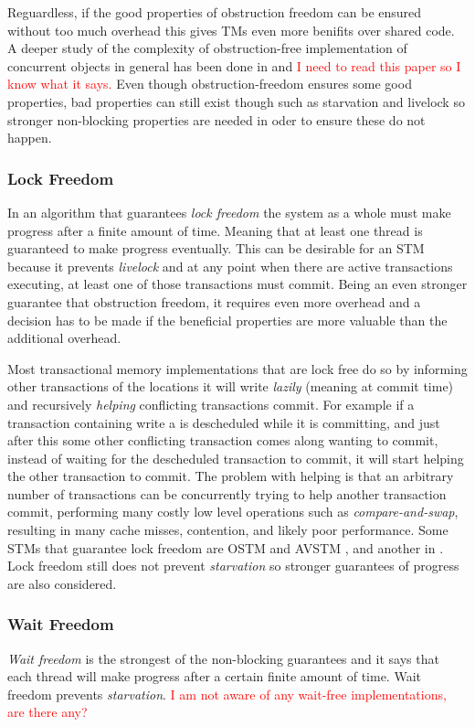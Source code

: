 Reguardless, if the good properties of obstruction freedom can be ensured without too much overhead this gives TMs even more benifits over shared code.
A deeper study of the complexity of obstruction-free implementation of concurrent objects in general has been done in \cite{1538908} and \textcolor{Red}{I need to read this paper so I know what it says.}
Even though obstruction-freedom ensures some good properties, bad properties can still exist though such as starvation and livelock so stronger non-blocking properties are needed in oder to ensure these do not happen.

\subsubsection{Lock Freedom}
In an algorithm that guarantees \emph{lock freedom} the system as a whole must make progress after a finite amount of time.
Meaning that at least one thread is guaranteed to make progress eventually.
This can be desirable for an STM because it prevents \emph{livelock} and at any point when there are active transactions executing, at least one of those transactions must commit.
Being an even stronger guarantee that obstruction freedom, it requires even more overhead and a decision has to be made if the beneficial properties are more valuable than the additional overhead.

Most transactional memory implementations that are lock free do so by informing other transactions of the locations it will write \emph{lazily} (meaning at commit time) and recursively \emph{helping} conflicting transactions commit.
For example if a transaction containing write a is descheduled while it is committing, and just after this some other conflicting transaction comes along wanting to commit, instead of waiting for the descheduled transaction to commit, it will start helping the other transaction to commit.
The problem with helping is that an arbitrary number of transactions can be concurrently trying to help another transaction commit, performing many costly low level operations such as \emph{compare-and-swap}, resulting in many cache misses, contention, and likely poor performance.
Some STMs that guarantee lock freedom are OSTM \cite{Fraser:2007:CPW:1233307.1233309} and AVSTM \cite{LPD-CONF-2008-031}, and another in \cite{Alvisi_lock-freeserializable}.
Lock freedom still does not prevent \emph{starvation} so stronger guarantees of progress are also considered.

\subsubsection{Wait Freedom}
\emph{Wait freedom} is the strongest of the non-blocking guarantees and it says that each thread will make progress after a certain finite amount of time.
Wait freedom prevents \emph{starvation}.
\textcolor{Red}{I am not aware of any wait-free implementations, are there any?}

